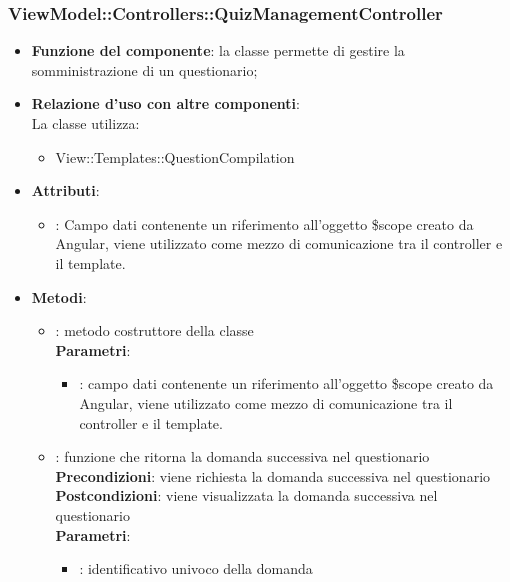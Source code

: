\subsubsection{ViewModel::Controllers::QuizManagementController}
\begin{itemize}
\item\textbf{Funzione del componente}: la classe permette di gestire la somministrazione di un questionario;
	\item\textbf{Relazione d'uso con altre componenti}: \\
La classe utilizza:
	\begin{itemize}
		\item View::Templates::QuestionCompilation
	\end{itemize}
\item\textbf{Attributi}:
	\begin{itemize}
		\item{}: Campo dati contenente un riferimento all’oggetto \$scope creato da Angular, viene utilizzato come mezzo di comunicazione tra il controller e il template.\\
	\end{itemize}
\item\textbf{Metodi}:
	\begin{itemize}
		\item{}: metodo costruttore della classe\\
		\textbf{Parametri}:
			\begin{itemize}
				\item{}: campo dati contenente un riferimento all'oggetto \$scope creato da Angular, viene utilizzato come mezzo di comunicazione tra il controller e il template.\\
			\end{itemize}
		\item{}: funzione che ritorna la domanda successiva nel questionario\\
		\textbf{Precondizioni}: viene richiesta la domanda successiva nel questionario\\
		\textbf{Postcondizioni}: viene visualizzata la domanda successiva nel questionario\\
		\textbf{Parametri}:
			\begin{itemize}
				\item{}: identificativo univoco della domanda\\
			\end{itemize}

\end{itemize}
\end{itemize}
